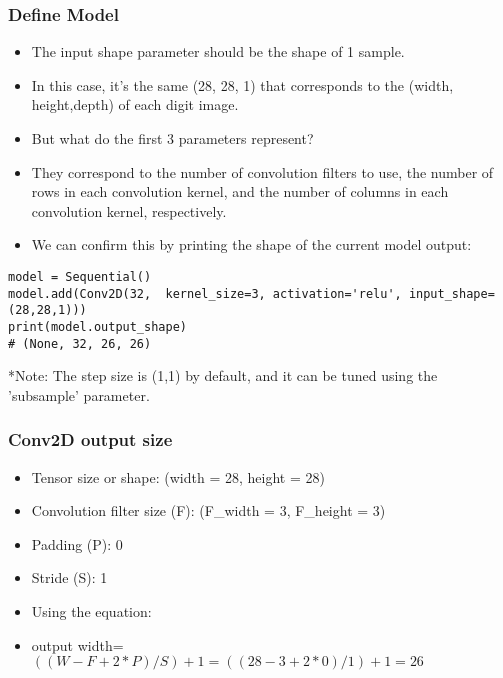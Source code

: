 \begin{frame}[fragile] \frametitle{Define Model}

\begin{itemize}
\item The input shape parameter should be the shape of 1 sample. 
\item In this case, it's the same (28, 28, 1) that corresponds to  the (width, height,depth) of each digit image.
\item But what do the first 3 parameters represent? 
\item They correspond to the number of convolution filters to use, the number of rows in each convolution kernel, and the number of columns in each convolution kernel, respectively.
\item We can confirm this by printing the shape of the current model output:
\end{itemize}
\begin{lstlisting}
model = Sequential()
model.add(Conv2D(32,  kernel_size=3, activation='relu', input_shape=(28,28,1)))
print(model.output_shape)
# (None, 32, 26, 26)
\end{lstlisting}
*Note: The step size is (1,1) by default, and it can be tuned using the 'subsample' parameter.
\end{frame}



\begin{frame}[fragile] \frametitle{Conv2D output size}

\begin{itemize}
\item Tensor size or shape: (width = 28, height = 28)
\item Convolution filter size (F): (F\_width = 3, F\_height = 3)
\item Padding (P): 0
\item Stride (S): 1
\item Using the equation:
\item output width=$((W-F+2*P )/S)+ 1 = ((28-3+2*0)/1) + 1 = 26$
\end{itemize}


\end{frame}



